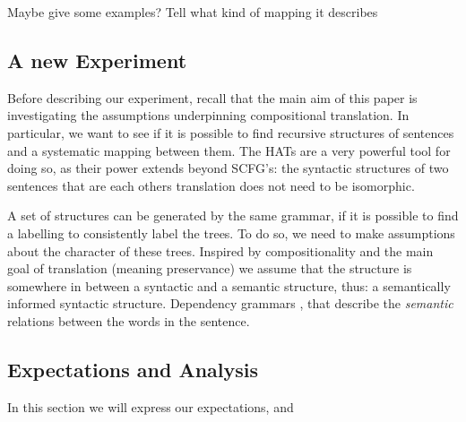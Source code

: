 \documentclass{report}
\theoremstyle{definition}
\theoremstyle{plain}
\begin{document}
Maybe give some examples? Tell what kind of mapping it describes

\subsection{A new Experiment}

Before describing our experiment, recall that the main aim of this paper is investigating the assumptions underpinning compositional translation. In particular, we want to see if it is possible to find recursive structures of sentences and a systematic mapping between them. The HATs are a very powerful tool for doing so, as their power extends beyond SCFG's: the syntactic structures of two sentences that are each others translation does not need to be isomorphic.


A set of structures can be generated by the same grammar, if it is possible to find a labelling to consistently label the trees. 
To do so, we need to make assumptions about the character of these trees. Inspired by compositionality and the main goal of translation (meaning preservance) we assume that the structure is somewhere in between a syntactic and a semantic structure, thus: a semantically informed syntactic structure.
Dependency grammars \cite{schubert1987metataxis}, that describe the \textit{semantic} relations between the words in the sentence.



\subsection{Expectations and Analysis}


In this section we will express our expectations, and 

\end{document}
